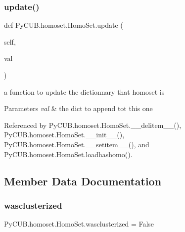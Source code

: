 \mbox{\label{class_py_c_u_b_1_1homoset_1_1_homo_set_a8cf76800f047841bf63d507fb1b54048}} 
\subsubsection{\texorpdfstring{update()}{update()}}
{\footnotesize\ttfamily def Py\+C\+U\+B.\+homoset.\+Homo\+Set.\+update (\begin{DoxyParamCaption}\item[{}]{self,  }\item[{}]{val }\end{DoxyParamCaption})}



a function to update the dictionnary that homoset is 


\begin{DoxyParams}{Parameters}
{\em val} & the dict to append tot this one \\
\hline
\end{DoxyParams}


Referenced by Py\+C\+U\+B.\+homoset.\+Homo\+Set.\+\_\+\+\_\+delitem\+\_\+\+\_\+(), Py\+C\+U\+B.\+homoset.\+Homo\+Set.\+\_\+\+\_\+init\+\_\+\+\_\+(), Py\+C\+U\+B.\+homoset.\+Homo\+Set.\+\_\+\+\_\+setitem\+\_\+\+\_\+(), and Py\+C\+U\+B.\+homoset.\+Homo\+Set.\+loadhashomo().



\subsection{Member Data Documentation}
\mbox{\label{class_py_c_u_b_1_1homoset_1_1_homo_set_ade27fdf472815f4fb2eb1d1ef552ad42}} 
\subsubsection{\texorpdfstring{wasclusterized}{wasclusterized}}
{\footnotesize\ttfamily Py\+C\+U\+B.\+homoset.\+Homo\+Set.\+wasclusterized = False\hspace{0.3cm}{\ttfamily [static]}}



